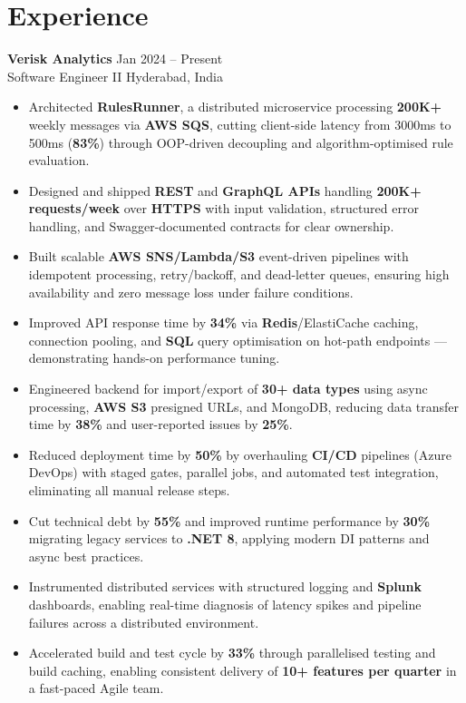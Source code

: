 \documentclass[10pt,letterpaper]{article}
\newcommand{\resumeSubheading}[4]{%
  \textbf{#1} \hfill #2 \\
  #3 \hfill #4 \\
}
\begin{document}
\section*{Experience}
\resumeSubheading{Verisk Analytics}{Jan 2024 -- Present}{Software Engineer II}{Hyderabad, India}
\begin{itemize}
    \item Architected \textbf{RulesRunner}, a distributed microservice processing \textbf{200K+} weekly messages via \textbf{AWS SQS}, cutting client-side latency from 3000ms to 500ms (\textbf{83\%}) through OOP-driven decoupling and algorithm-optimised rule evaluation.
    \item Designed and shipped \textbf{REST} and \textbf{GraphQL APIs} handling \textbf{200K+ requests/week} over \textbf{HTTPS} with input validation, structured error handling, and Swagger-documented contracts for clear ownership.
    \item Built scalable \textbf{AWS SNS/Lambda/S3} event-driven pipelines with idempotent processing, retry/backoff, and dead-letter queues, ensuring high availability and zero message loss under failure conditions.
    \item Improved API response time by \textbf{34\%} via \textbf{Redis}/ElastiCache caching, connection pooling, and \textbf{SQL} query optimisation on hot-path endpoints — demonstrating hands-on performance tuning.
    \item Engineered backend for import/export of \textbf{30+ data types} using async processing, \textbf{AWS S3} presigned URLs, and MongoDB, reducing data transfer time by \textbf{38\%} and user-reported issues by \textbf{25\%}.
    \item Reduced deployment time by \textbf{50\%} by overhauling \textbf{CI/CD} pipelines (Azure DevOps) with staged gates, parallel jobs, and automated test integration, eliminating all manual release steps.
    \item Cut technical debt by \textbf{55\%} and improved runtime performance by \textbf{30\%} migrating legacy services to \textbf{.NET 8}, applying modern DI patterns and async best practices.
    \item Instrumented distributed services with structured logging and \textbf{Splunk} dashboards, enabling real-time diagnosis of latency spikes and pipeline failures across a distributed environment.
    \item Accelerated build and test cycle by \textbf{33\%} through parallelised testing and build caching, enabling consistent delivery of \textbf{10+ features per quarter} in a fast-paced Agile team.
\end{itemize}
\end{document}

